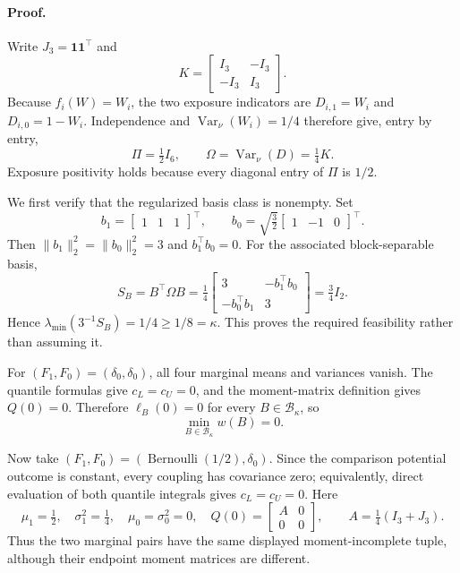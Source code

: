 \paragraph{Proof.}
Write \(J_3=\mathbf 1\mathbf 1^{\top}\) and
\[
K=\begin{bmatrix}I_3&-I_3\\-I_3&I_3\end{bmatrix}.
\]
Because \(f_i(W)=W_i\), the two exposure indicators are \(D_{i,1}=W_i\) and \(D_{i,0}=1-W_i\).  Independence and \(\operatorname{Var}_{\nu}(W_i)=1/4\) therefore give, entry by entry,
\[
\Pi=\tfrac12 I_6,
\qquad
\Omega=\operatorname{Var}_{\nu}(D)=\tfrac14 K.
\]
Exposure positivity holds because every diagonal entry of \(\Pi\) is \(1/2\).

We first verify that the regularized basis class is nonempty.  Set
\[
b_1=\begin{bmatrix}1&1&1\end{bmatrix}^{\top},
\qquad
b_0=\sqrt{\tfrac32}\begin{bmatrix}1&-1&0\end{bmatrix}^{\top}.
\]
Then \(\lVert b_1\rVert_2^2=\lVert b_0\rVert_2^2=3\) and \(b_1^{\top}b_0=0\).  For the associated block-separable basis,
\[
S_B=B^{\top}\Omega B
=\tfrac14
\begin{bmatrix}
3&-b_1^{\top}b_0\\
-b_0^{\top}b_1&3
\end{bmatrix}
=\tfrac34 I_2.
\]
Hence \(\lambda_{\min}(3^{-1}S_B)=1/4\ge1/8=\kappa\).  This proves the required feasibility rather than assuming it.

For \((F_1,F_0)=(\delta_0,\delta_0)\), all four marginal means and variances vanish.  The quantile formulas give \(c_L=c_U=0\), and the moment-matrix definition gives \(Q(0)=0\).  Therefore \(\ell_B(0)=0\) for every \(B\in\mathcal B_\kappa\), so
\[
\min_{B\in\mathcal B_\kappa}w(B)=0.
\]

Now take \((F_1,F_0)=(\operatorname{Bernoulli}(1/2),\delta_0)\).  Since the comparison potential outcome is constant, every coupling has covariance zero; equivalently, direct evaluation of both quantile integrals gives \(c_L=c_U=0\).  Here
\[
\mu_1=\tfrac12,
\quad \sigma_1^2=\tfrac14,
\quad \mu_0=\sigma_0^2=0,
\quad
Q(0)=\begin{bmatrix}A&0\\0&0\end{bmatrix},
\qquad
A=\tfrac14(I_3+J_3).
\]
Thus the two marginal pairs have the same displayed moment-incomplete tuple, although their endpoint moment matrices are different.

